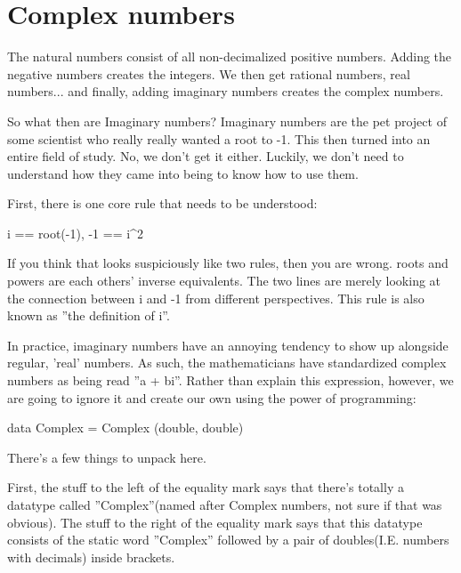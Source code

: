 
\section{Complex numbers}
\iffalse
Här är målet främst att introducera dsl som koncept och även introducera hur vi behandlar komplexa tal eftersom detta kommer återkomma mycket i texten. Vi gör detta genom att snabbt repetera komplexa tal. Vi antar dock att läsaren egentligen är bekväm med komplexa tal och att detta istället är en mjukstart för dsl, haskell och våra egna betäckningar.\\
\fi

The natural numbers consist of all non-decimalized positive numbers. Adding the negative numbers creates the integers. We then get rational numbers, real numbers... and finally, adding imaginary numbers creates the complex numbers. %

So what then are Imaginary numbers? Imaginary numbers are the pet project of some scientist who really really wanted a root to -1. This then turned into an entire field of study. No, we don't get it either. Luckily, we don't need to understand how they came into being to know how to use them.

First, there is one core rule that needs to be understood:
\begin{code}
i == root(-1),
-1 == i^2
\end{code}
If you think that looks suspiciously like two rules, then you are wrong. roots and powers are each others' inverse equivalents. The two lines are merely looking at the connection between i and -1 from different perspectives. This rule is also known as ''the definition of i''. %

In practice, imaginary numbers have an annoying tendency to show up alongside regular, 'real' numbers. As such, the mathematicians have standardized complex numbers as being read ''a + bi''. Rather than explain this expression, however, we are going to ignore it and create our own using the power of programming:
\begin{code}
data Complex = Complex (double, double)
\end{code}
There's a few things to unpack here.

First, the stuff to the left of the equality mark says that there's totally a datatype called ''Complex''(named after Complex numbers, not sure if that was obvious). The stuff to the right of the equality mark says that this datatype consists of the static word ''Complex'' followed by a pair of doubles(I.E. numbers with decimals) inside brackets.

